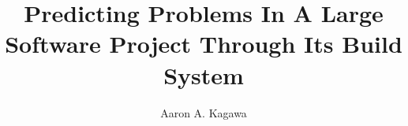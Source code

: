 \documentclass[11pt,proposal,times,thesis,actual]{uhthesis2e}
\begin{document}
\title{Predicting Problems In A Large Software Project Through Its Build System}
\author{Aaron A. Kagawa}
\othermembers{ }

\maketitle

\begin{frontmatter}

\tableofcontents
\end{frontmatter}

\setcounter{chapter}{0}
\setcounter{chapter}{2}
\setcounter{chapter}{3} 



\end{document}
